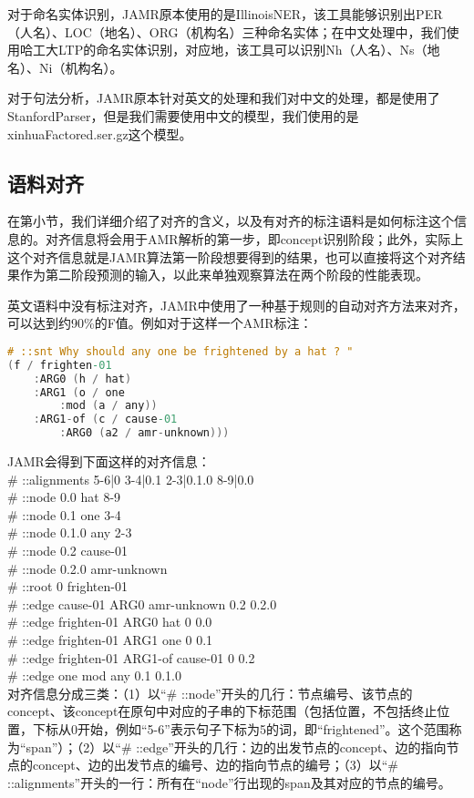 \documentclass[master, winfont]{njuthesis}
\begin{document}
对于命名实体识别，JAMR原本使用的是IllinoisNER，该工具能够识别出PER（人名）、LOC（地名）、ORG（机构名）三种命名实体；在中文处理中，我们使用哈工大LTP的命名实体识别，对应地，该工具可以识别Nh（人名）、Ns（地名）、Ni（机构名）。

对于句法分析，JAMR原本针对英文的处理和我们对中文的处理，都是使用了StanfordParser，但是我们需要使用中文的模型，我们使用的是xinhuaFactored.ser.gz这个模型。

\subsection{语料对齐}
\label{subsection:dataalign}
在第\label{subsubsection:aligndata}小节，我们详细介绍了对齐的含义，以及有对齐的标注语料是如何标注这个信息的。对齐信息将会用于AMR解析的第一步，即concept识别阶段；此外，实际上这个对齐信息就是JAMR算法第一阶段想要得到的结果，也可以直接将这个对齐结果作为第二阶段预测的输入，以此来单独观察算法在两个阶段的性能表现。

英文语料中没有标注对齐，JAMR中使用了一种基于规则的自动对齐方法来对齐，可以达到约90\%的F值\cite{Flanigan2014}。例如对于这样一个AMR标注：

\begin{lstlisting}[language=C]
# ::snt Why should any one be frightened by a hat ? "
(f / frighten-01
	:ARG0 (h / hat)
	:ARG1 (o / one
		:mod (a / any))
	:ARG1-of (c / cause-01
		:ARG0 (a2 / amr-unknown)))
\end{lstlisting}

JAMR会得到下面这样的对齐信息：\\
\# ::alignments 5-6|0 3-4|0.1 2-3|0.1.0 8-9|0.0 \\
\# ::node	0.0	hat	8-9  \\
\# ::node	0.1	one	3-4  \\
\# ::node	0.1.0	any	2-3  \\
\# ::node	0.2	cause-01	  \\
\# ::node	0.2.0	amr-unknown  \\	
\# ::root	0	frighten-01 \\
\# ::edge	cause-01	ARG0	amr-unknown	0.2	0.2.0	\\
\# ::edge	frighten-01	ARG0	hat	0	0.0	 \\
\# ::edge	frighten-01	ARG1	one	0	0.1	 \\
\# ::edge	frighten-01	ARG1-of	cause-01	0	0.2	 \\
\# ::edge	one	mod	any	0.1	0.1.0	 \\

对齐信息分成三类：（1）以“\# ::node”开头的几行：节点编号、该节点的concept、该concept在原句中对应的子串的下标范围（包括位置，不包括终止位置，下标从0开始，例如“5-6”表示句子下标为5的词，即“frightened”。这个范围称为“span”）；（2）以“\# ::edge”开头的几行：边的出发节点的concept、边的指向节点的concept、边的出发节点的编号、边的指向节点的编号；（3）以“\# ::alignments”开头的一行：所有在“node”行出现的span及其对应的节点的编号。
\end{document}
